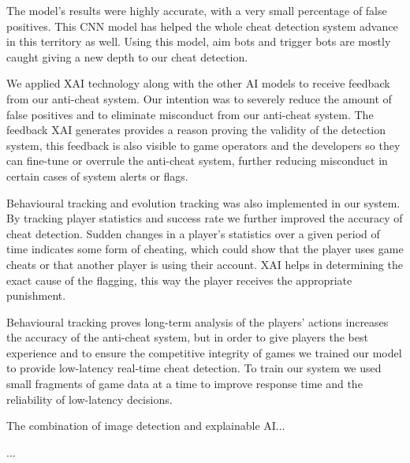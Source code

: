The model's results were highly accurate, with a very small percentage of false positives. This CNN model has helped the whole cheat detection system advance in this territory as well. Using this model, aim bots and trigger bots are mostly caught giving a new depth to our cheat detection.

We applied XAI technology along with the other AI models to receive feedback from our anti-cheat system. Our intention was to severely reduce the amount of false positives and to eliminate misconduct from our anti-cheat system. The feedback XAI generates provides a reason proving the validity of the detection system, this feedback is also visible to game operators and the developers so they can fine-tune or overrule the anti-cheat system, further reducing misconduct in certain cases of system alerts or flags.

Behavioural tracking and evolution tracking was also implemented in our system. By tracking player statistics and success rate we further improved the accuracy of cheat detection. Sudden changes in a player’s statistics over a given period of time indicates some form of cheating, which could show that the player uses game cheats or that another player is using their account. XAI helps in determining the exact cause of the flagging, this way the player receives the appropriate punishment. 

Behavioural tracking proves long-term analysis of the players’ actions increases the accuracy of the anti-cheat system, but in order to give players the best experience and to ensure the competitive integrity of games we trained our model to provide low-latency real-time cheat detection. To train our system we used small fragments of game data at a time to improve response time and the reliability of low-latency decisions.

The combination of image detection and explainable AI... \cite{tao2020xai}



...